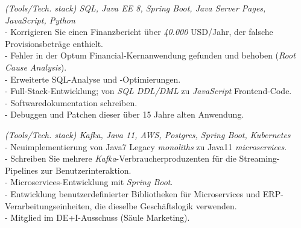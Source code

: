 \documentclass[]{CV-JuanCamiloFlorez}
\begin{document}
\begin{minipage}[t]{0.66\textwidth}
    \textit{(Tools/Tech. stack) SQL, Java EE 8, Spring Boot, Java Server Pages, JavaScript, Python} \\
        - Korrigieren Sie einen Finanzbericht über \textit{40.000} USD/Jahr, der falsche Provisionsbeträge enthielt. \\
        - Fehler in der Optum Financial-Kernanwendung gefunden und behoben (\textit{Root Cause Analysis}). \\
        - Erweiterte SQL-Analyse und -Optimierungen. \\
        - Full-Stack-Entwicklung; von \textit{SQL DDL/DML} zu \textit{JavaScript} Frontend-Code. \\
        - Softwaredokumentation schreiben. \\
        - Debuggen und Patchen dieser über 15 Jahre alten Anwendung. \\
        \sectionsep

    \textit{(Tools/Tech. stack) Kafka, Java 11, AWS, Postgres, Spring Boot, Kubernetes} \\
        - Neuimplementierung von Java7 Legacy \textit{monoliths} zu Java11 \textit{microservices}. \\
        - Schreiben Sie mehrere \textit{Kafka}-Verbraucherproduzenten für die Streaming-Pipelines zur Benutzerinteraktion. \\
        - Microservices-Entwicklung mit \textit{Spring Boot}. \\
        - Entwicklung benutzerdefinierter Bibliotheken für Microservices und ERP-Verarbeitungseinheiten, die dieselbe Geschäftslogik verwenden. \\
        - Mitglied im DE+I-Ausschuss (Säule Marketing). \\
        \sectionsep


\end{minipage}
\end{document}
